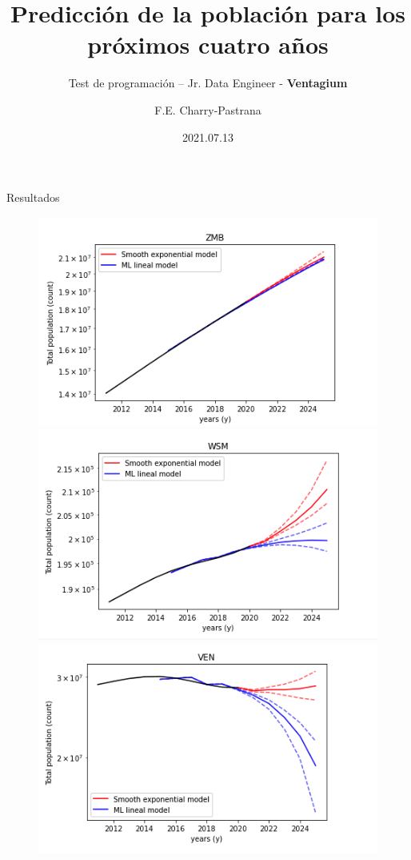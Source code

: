 \documentclass[10pt]{beamer}
\title{Predicción de la población para los próximos cuatro años}
\subtitle{Test de programación – Jr. Data Engineer - \textbf{Ventagium}}
\author{F.E. Charry-Pastrana}
\date{2021.07.13}
\begin{document}
\begin{frame}
\titlepage
\end{frame}


\begin{frame}{Resultados}
\begin{figure}
\includegraphics[scale=0.3]{img/1.png}
\includegraphics[scale=0.3]{img/2.png}
\includegraphics[scale=0.3]{img/3.png}

\end{figure}
\end{frame}
\end{document}
